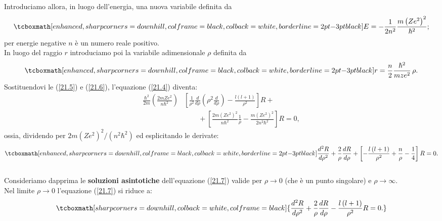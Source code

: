 Introduciamo allora, in luogo dell'energia, una nuova variabile definita da
	\begin{equation}
		\tcboxmath[enhanced, sharp corners=downhill, colframe=black, colback=white, borderline={2pt}{-3pt}{black}]{
			E=-\frac{1}{2n^2}\frac{m\left(Ze^2\right)^2}{\hbar^2} ;
			}
	\label{21.5}
	\end{equation}
per energie negative $n$ è un numero reale positivo.\\

In luogo del raggio $r$ introduciamo poi la variabile adimensionale $\rho$ definita da 
	\begin{equation}
		\tcboxmath[enhanced, sharp corners=downhill, colframe=black, colback=white, borderline={2pt}{-3pt}{black}]{
			r=\frac{n}{2}\frac{\hbar^2}{mze^2}\, \rho .
			}
	\label{21.6}
	\end{equation}
Sostituendovi le (\ref{21.5}) e (\ref{21.6}), l'equazione (\ref{21.4}) diventa:
	\begin{align}
		\frac{\hbar^2}{2m}\left(\frac{2mZe^2}{n\hbar^2}\right) &\left[\frac{1}{\rho^2}\frac{d}{d\rho}\left(\rho^2\frac{d}{d\rho}\right)   -\frac{l\left(l+1\right)}{\rho^2}\right]R +\nonumber \\
		& \qquad + \left[\frac{2m\left(Ze^2\right)^2}{n\hbar^2}\frac{1}{\rho}-\frac{m\left(Ze^2\right)^2}{2n^2\hbar^2}\right]R=0 ,
	\end{align}
ossia, dividendo per $2m\left(Ze^2\right)^2/\left(n^2\hbar^2\right)$ ed esplicitando le derivate:
	\begin{equation}
		\tcboxmath[enhanced, sharp corners=downhill, colframe=black, colback=white, borderline={2pt}{-3pt}{black}]{
			\frac{d^2R}{d\rho^2}+\frac{2}{\rho}\frac{dR}{d\rho}+\left[-\frac{l\left(l+1\right)}{\rho^2}+\frac{n}{\rho}-\frac{1}{4}\right]R=0 .
			}
	\label{21.7}
	\end{equation}\\

Consideriamo dapprima le \textbf{soluzioni asintotiche} dell'equazione (\ref{21.7}) valide per $\rho\rightarrow0$ (che è un punto singolare) e $\rho\rightarrow\infty$.\\

Nel limite \textbf{$\rho\rightarrow0$} l'equazione (\ref{21.7}) si riduce a:
	\begin{equation}
		\tcboxmath[sharp corners=downhill, colback=white, colframe=black]{
			\frac{d^2R}{d\rho^2}+\frac{2}{\rho}\frac{dR}{d\rho}-\frac{l\left(l+1\right)}{\rho^2}R=0 .
			}
	\label{21.8}
	\end{equation}\\
	
